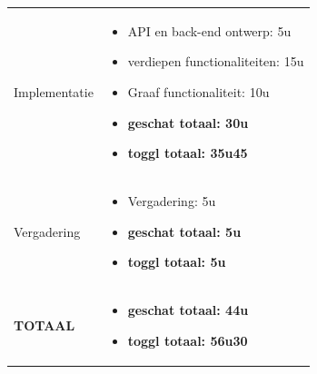 \documentclass{article}
\begin{document}
\begin{center}
\begin{tabularx}{\textwidth}[t]{XX}
\arrayrulecolor{black}\hline


\vspace{1 mm}
Implementatie & 
\begin{minipage}[t]{\linewidth}%
\vspace{1 mm}
\begin{itemize}
\item API en back-end ontwerp: 5u
\item verdiepen functionaliteiten: 15u
\item Graaf functionaliteit: 10u 
\item \textbf{geschat totaal: 30u}
\item \textbf{toggl totaal: 35u45}
\end{itemize} 
\vspace{1 mm}
\end{minipage}\\


\arrayrulecolor{black}\hline

\vspace{2 mm}
Vergadering & 
\begin{minipage}[t]{\linewidth}%
\vspace{2 mm}
\begin{itemize}
\item Vergadering: 5u
\item \textbf{geschat totaal: 5u}
\item \textbf{toggl totaal: 5u}
\vspace{2 mm}
\end{itemize} 
\end{minipage}\\

\arrayrulecolor{black}\hline

\vspace{2 mm}
\textbf{TOTAAL} & 
\begin{minipage}[t]{\linewidth}%
\vspace{2 mm}
\begin{itemize}
\item \textbf{geschat totaal: 44u}
\item \textbf{toggl totaal: 56u30}
\vspace{2 mm}
\end{itemize} 
\end{minipage}\\

\end{tabularx}
\end{center}
\end{document}
